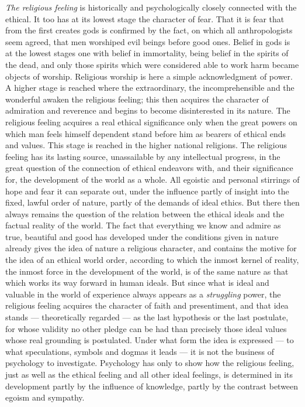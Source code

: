 \documentclass[12pt,a4paper]{book}
\newcommand{\opage}[1]{\marginnote{\footnotesize\textit{[#1]}}}
\begin{document}
\emph{The religious feeling} is historically and psychologically closely
connected with the ethical. It too has at its lowest stage the character
of fear. That it is fear that from the first creates gods is confirmed by
the fact, on which all anthropologists seem agreed, that men worshiped
evil beings before good ones. Belief in gods is at the lowest stages one
with belief in immortality, being belief in the spirits of the dead, and
only those spirits which were considered able to work harm became
objects of worship. Religious worship is here a simple acknowledgment of
power. A higher stage is reached where the extraordinary, the
incomprehensible and the wonderful awaken the religious feeling; this
then acquires the character of admiration and reverence and begins to
become disinterested in its nature. The religious feeling acquires a
real ethical significance only when the great powers on which man feels
himself dependent stand before him as bearers of ethical ends and
values. This stage is reached in the higher national religions. The
religious feeling has its lasting source, unassailable by any
intellectual progress, in the great question of the connection of
ethical endeavors with, and their significance for, the development of
the world as a whole. All egoistic and personal stirrings of hope and
fear
\opage{313}it can separate out, under the influence partly of insight
into the fixed, lawful order of nature, partly of the demands of ideal
ethics. But there then always remains the question of the relation
between the ethical ideals and the factual reality of the world. The
fact that everything we know and admire as true, beautiful and good has
developed under the conditions given in nature already gives the idea of
nature a religious character, and contains the motive for the idea of an
ethical world order, according to which the inmost kernel of reality,
the inmost force in the development of the world, is of the same nature
as that which works its way forward in human ideals. But since what is
ideal and valuable in the world of experience always appears as a
\emph{struggling} power, the religious feeling acquires the character of
faith and presentiment, and that idea stands --- theoretically regarded
--- as the last hypothesis or the last postulate, for whose validity no
other pledge can be had than precisely those ideal values whose real
grounding is postulated. Under what form the idea is expressed --- to
what speculations, symbols and dogmas it leads --- it is not the
business of psychology to investigate. Psychology has only to show how
the religious feeling, just as well as the ethical feeling and all other
ideal feelings, is determined in its development partly by the influence
of knowledge, partly by the contrast between egoism and sympathy.
\end{document}
